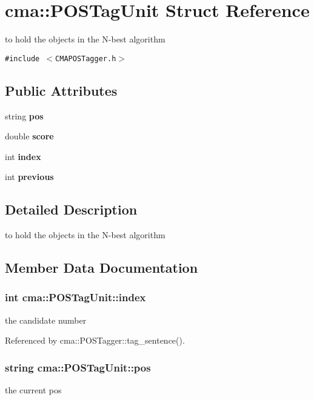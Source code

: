 \section{cma::POSTagUnit Struct Reference}
\label{structcma_1_1POSTagUnit}
to hold the objects in the N-best algorithm  


{\tt \#include $<$CMAPOSTagger.h$>$}

\subsection*{Public Attributes}
\begin{CompactItemize}
\item 
string {\bf pos}
\item 
double {\bf score}
\item 
int {\bf index}
\item 
int {\bf previous}
\end{CompactItemize}


\subsection{Detailed Description}
to hold the objects in the N-best algorithm 

\subsection{Member Data Documentation}
\subsubsection[{index}]{\setlength{\rightskip}{0pt plus 5cm}int {\bf cma::POSTagUnit::index}}\label{structcma_1_1POSTagUnit_982a3b0932a72ce0a96de0bb24f6d849}


the candidate number 

Referenced by cma::POSTagger::tag\_\-sentence().
\subsubsection[{pos}]{\setlength{\rightskip}{0pt plus 5cm}string {\bf cma::POSTagUnit::pos}}\label{structcma_1_1POSTagUnit_695dce4497a36b42431d5506fdccf30e}


the current pos 

